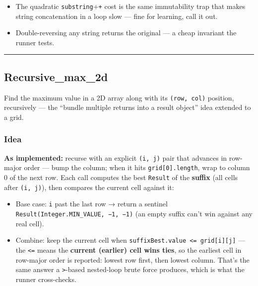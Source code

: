 \documentclass[
  10pt,
  letterpaper,
  onecolumn]{article}
\providecommand{\tightlist}{%
  \setlength{\itemsep}{0pt}\setlength{\parskip}{0pt}}
\begin{document}
\begin{itemize}
\tightlist
\item
  The quadratic \texttt{substring}+\texttt{+} cost is the same
  immutability trap that makes string concatenation in a loop slow ---
  fine for learning, call it out.
\item
  Double-reversing any string returns the original --- a cheap invariant
  the runner tests.
\end{itemize}

\begin{center}\rule{0.5\linewidth}{0.5pt}\end{center}

\hypertarget{recursive_max_2d}{%
\subsection{Recursive\_max\_2d}\label{recursive_max_2d}}

Find the maximum value in a 2D array along with its \texttt{(row,\ col)}
position, recursively --- the ``bundle multiple returns into a result
object'' idea extended to a grid.

\hypertarget{idea-4}{%
\subsubsection{Idea}\label{idea-4}}

\textbf{As implemented:} recurse with an explicit \texttt{(i,\ j)} pair
that advances in row-major order --- bump the column; when it hits
\texttt{grid{[}0{]}.length}, wrap to column 0 of the next row. Each call
computes the best \texttt{Result} of the \textbf{suffix} (all cells
after \texttt{(i,\ j)}), then compares the current cell against it:

\begin{itemize}
\tightlist
\item
  Base case: \texttt{i} past the last row → return a sentinel
  \texttt{Result(Integer.MIN\_VALUE,\ −1,\ −1)} (an empty suffix can't
  win against any real cell).
\item
  Combine: keep the current cell when
  \texttt{suffixBest.value\ \textless{}=\ grid{[}i{]}{[}j{]}} --- the
  \texttt{\textless{}=} means the \textbf{current (earlier) cell wins
  ties}, so the earliest cell in row-major order is reported: lowest row
  first, then lowest column. That's the same answer a
  \texttt{\textgreater{}}-based nested-loop brute force produces, which
  is what the runner cross-checks.
\end{itemize}
\end{document}
